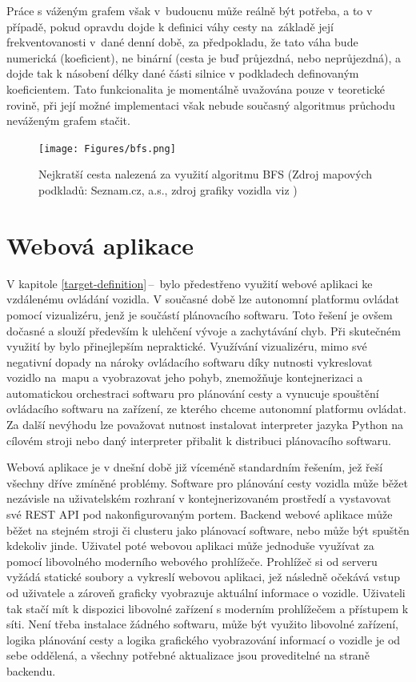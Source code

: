 \documentclass[czech, bachelor]{diploma}
\newcommand{\peteref}[1]{\ref{#1}\,--\,\nameref{#1}}
\begin{document}
Práce s váženým grafem však v~budoucnu může reálně být potřeba, a to v případě, pokud opravdu dojde k definici váhy cesty
na~základě její frekventovanosti v~dané denní době, za předpokladu, že tato váha bude numerická (koeficient), ne binární
(cesta je buď průjezdná, nebo neprůjezdná), a dojde tak k násobení délky dané části silnice v podkladech definovaným koeficientem.
Tato funkcionalita je momentálně uvažována pouze v teoretické rovině, při její možné implementaci však nebude současný algoritmus
průchodu neváženým grafem stačit.

\begin{figure}
    \centering
    \texttt{[image: Figures/bfs.png]}
    \caption{Nejkratší cesta nalezená za využití algoritmu BFS (Zdroj mapových podkladů: Seznam.cz, a.s., zdroj grafiky
    vozidla viz \cite{car-sprite-source})}
    \label{fig:bfs}
\end{figure}

\chapter{Webová aplikace} \label{web-app}

V kapitole \peteref{target-definition} bylo předestřeno využití webové aplikaci ke vzdálenému ovládání vozidla. V současné době
lze autonomní platformu ovládat pomocí vizualizéru, jenž je součástí plánovacího softwaru. Toto řešení je ovšem dočasné a slouží
především k ulehčení vývoje a zachytávání chyb. Při skutečném využití by bylo přinejlepším nepraktické. Využívání vizualizéru,
mimo své negativní dopady na nároky ovládacího softwaru díky nutnosti vykreslovat vozidlo na~mapu a vyobrazovat jeho pohyb,
znemožňuje kontejnerizaci a automatickou orchestraci \cite{virtualization-source} softwaru pro plánování cesty a vynucuje spouštění
ovládacího softwaru na zařízení, ze kterého chceme autonomní platformu ovládat. Za další nevýhodu lze považovat nutnost instalovat
interpreter jazyka Python na cílovém stroji nebo daný interpreter přibalit k distribuci plánovacího softwaru.

Webová aplikace je v dnešní době již víceméně standardním řešením, jež řeší všechny dříve zmíněné problémy. Software pro plánování
cesty vozidla může běžet nezávisle na uživatelském rozhraní v kontejnerizovaném prostředí a vystavovat své REST API
pod nakonfigurovaným portem. Backend webové aplikace může běžet na stejném stroji či clusteru jako plánovací software, nebo může
být spuštěn kdekoliv jinde. Uživatel poté webovou aplikaci může jednoduše využívat za pomocí libovolného moderního webového
prohlížeče. Prohlížeč si od serveru vyžádá statické soubory a vykreslí webovou aplikaci, jež následně očekává vstup od uživatele
a zároveň graficky vyobrazuje aktuální informace o vozidle. Uživateli tak stačí mít k dispozici libovolné zařízení s moderním
prohlížečem a přístupem k síti. Není třeba instalace žádného softwaru, může být využito libovolné zařízení, logika plánování cesty
a logika grafického vyobrazování informací o vozidle je od sebe oddělená, a všechny potřebné aktualizace jsou proveditelné
na straně backendu.
\end{document}
